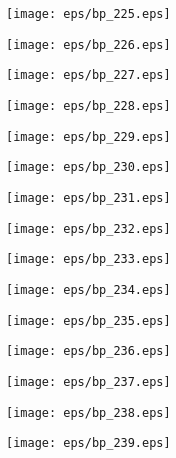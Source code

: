 \documentclass{book}
\begin{document}
	\clearpage\begin{figure}[p]
    \centering
	\texttt{[image: eps/bp\_225.eps]}
	\end{figure}
	\clearpage\begin{figure}[p]
    \centering
	\texttt{[image: eps/bp\_226.eps]}
	\end{figure}
	\clearpage\begin{figure}[p]
    \centering
	\texttt{[image: eps/bp\_227.eps]}
	\end{figure}
	\clearpage\begin{figure}[p]
    \centering
	\texttt{[image: eps/bp\_228.eps]}
	\end{figure}
	\clearpage\begin{figure}[p]
    \centering
	\texttt{[image: eps/bp\_229.eps]}
	\end{figure}
	\clearpage\begin{figure}[p]
    \centering
	\texttt{[image: eps/bp\_230.eps]}
	\end{figure}
	\clearpage\begin{figure}[p]
    \centering
	\texttt{[image: eps/bp\_231.eps]}
	\end{figure}
	\clearpage\begin{figure}[p]
    \centering
	\texttt{[image: eps/bp\_232.eps]}
	\end{figure}
	\clearpage\begin{figure}[p]
    \centering
	\texttt{[image: eps/bp\_233.eps]}
	\end{figure}
	\clearpage\begin{figure}[p]
    \centering
	\texttt{[image: eps/bp\_234.eps]}
	\end{figure}
	\clearpage\begin{figure}[p]
    \centering
	\texttt{[image: eps/bp\_235.eps]}
	\end{figure}
	\clearpage\begin{figure}[p]
    \centering
	\texttt{[image: eps/bp\_236.eps]}
	\end{figure}
	\clearpage\begin{figure}[p]
    \centering
	\texttt{[image: eps/bp\_237.eps]}
	\end{figure}
	\clearpage\begin{figure}[p]
    \centering
	\texttt{[image: eps/bp\_238.eps]}
	\end{figure}
	\clearpage\begin{figure}[p]
    \centering
	\texttt{[image: eps/bp\_239.eps]}
	\end{figure}
\end{document}
